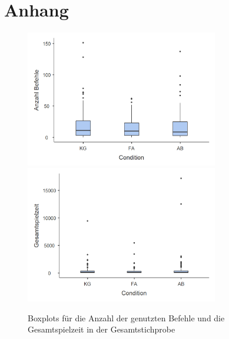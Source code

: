 \section{Anhang}
\begin{figure}[htbp]
    \centering
    \includegraphics[width=0.75\textwidth]{img/boxplot/befehle_alle_box_plot.png}
    \includegraphics[width=0.75\textwidth]{img/boxplot/zeit_alle_box_plot.png}
    \caption{Boxplots für die Anzahl der genutzten Befehle und die Gesamtspielzeit in der Gesamtstichprobe}
\end{figure}

